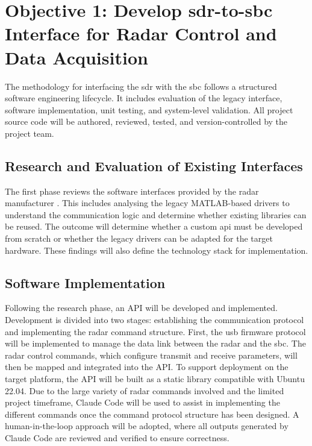 \section[Objective 1: Develop SDR-to-SBC Interface for Radar Control and Data Acquisition]{Objective 1: Develop \gls{sdr}-to-\gls{sbc} Interface for Radar Control and Data Acquisition}

The methodology for interfacing the \gls{sdr} with the \gls{sbc} follows a structured software engineering lifecycle. It includes evaluation of the legacy interface, software implementation, unit testing, and system-level validation. All project source code will be authored, reviewed, tested, and version-controlled by the project team.

\subsection{Research and Evaluation of Existing Interfaces}

The first phase reviews the software interfaces provided by the radar manufacturer \cite{luswavePUPDUAL24C}. This includes analysing the legacy MATLAB-based drivers to understand the communication logic and determine whether existing libraries can be reused. The outcome will determine whether a custom \gls{api} must be developed from scratch or whether the legacy drivers can be adapted for the target hardware. These findings will also define the technology stack for implementation.

\subsection{Software Implementation}

Following the research phase, an API will be developed and implemented. Development is divided into two stages: establishing the communication protocol and implementing the radar command structure. First, the \gls{usb} firmware protocol will be implemented to manage the data link between the radar and the \gls{sbc}. The radar control commands, which configure transmit and receive parameters, will then be mapped and integrated into the API. To support deployment on the target platform, the API will be built as a static library compatible with Ubuntu 22.04. Due to the large variety of radar commands involved and the limited project timeframe, Claude Code will be used to assist in implementing the different commands once the command protocol structure has been designed. A human-in-the-loop approach will be adopted, where all outputs generated by Claude Code are reviewed and verified to ensure correctness.

